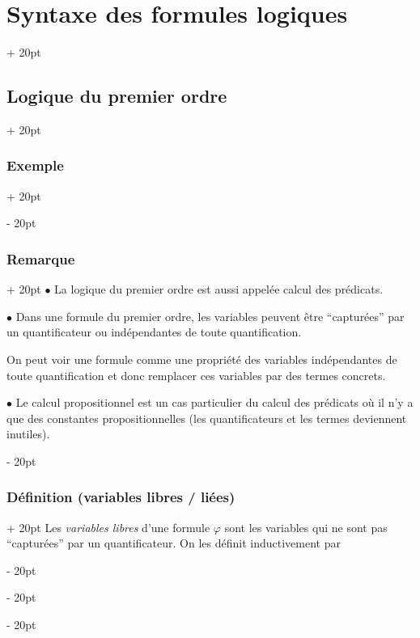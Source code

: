 \documentclass[a4paper, 12pt, twoside]{article}
\newcommand{\ind}[1][20pt]{\advance\leftskip + #1}
\newcommand{\deind}[1][20pt]{\advance\leftskip - #1}
\newenvironment{indt}[2][20pt]{#2 \par \ind[#1]}{\par \deind} %
\begin{document}
\begin{indt}{\section{Syntaxe des formules logiques}}
\begin{indt}{\subsection{Logique du premier ordre}}
\begin{indt}{\subsubsection{Exemple}}
\begin{center}
                \end{center}
            \end{indt}
            
            \vspace{12pt}
            
            \begin{indt}{\subsubsection{Remarque}}
                $\bullet$ La logique du premier ordre est aussi appelée calcul des prédicats.
                
                \vspace{12pt}
                
                $\bullet$ Dans une formule du premier ordre, les variables peuvent être ``capturées'' par un quantificateur ou indépendantes de toute quantification.
                
                On peut voir une formule comme une propriété des variables indépendantes de toute quantification et donc remplacer ces variables par des termes concrets.
                
                \vspace{12pt}
                
                $\bullet$ Le calcul propositionnel est un cas particulier du calcul des prédicats où il n'y a que des constantes propositionnelles (les quantificateurs et les termes deviennent inutiles).
            \end{indt}
            
            \vspace{12pt}
            
            \begin{indt}{\subsubsection{Définition (variables libres / liées)}}
                Les \textit{variables libres} d'une formule $\varphi$ sont les variables qui ne sont pas ``capturées'' par un quantificateur. On les définit inductivement par
                

\end{indt}
\end{indt}
\end{indt}
\end{document}
